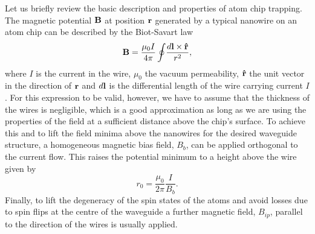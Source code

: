 Let us briefly review the basic description and properties of atom chip trapping. The magnetic potential $\bf B$ at position $\bf r$ generated by a typical nanowire on an atom chip can be described by the Biot-Savart law
\begin{equation}
   {\bf B}= \frac{\mu_0 I}{4\pi} \oint \! \frac{d{\bf l}  \times {\bf{\hat r}}}{{r^2 }},
\end{equation}
where $I$ is the current in the wire, $\mu_0$ the vacuum permeability, $\bf{\hat r}$ the unit vector in the direction of $\bf r$ and $d{\bf l}$ is the differential length of the wire carrying current $I$. For this expression to be valid, however, we have to assume that the thickness of the wires is negligible, which is a good approximation as long as we are using the properties of the field at a sufficient distance above the chip's surface. To achieve this and to lift the field minima above the nanowires for the desired waveguide structure, a homogeneous magnetic bias field, $B_b$, can be applied orthogonal to the current flow. This raises the potential minimum to a height above the wire given by
\begin{equation}
  r_0=   \frac{\mu_0}{2 \pi} \frac{I}{B_b}.
\end{equation}
Finally, to lift the degeneracy of the spin states of the atoms and avoid losses due to spin flips at the centre of the waveguide a further magnetic field, $B_{ip}$, parallel to the direction of the wires is usually applied.

